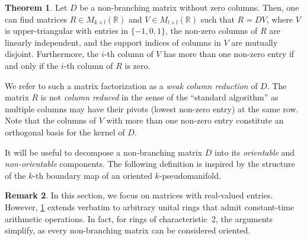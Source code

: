 \documentclass{article}
\theoremstyle{definition}
\newtheorem{theorem}{Theorem}[section]
\newtheorem{remark}[theorem]{Remark}
\begin{document}
\begin{theorem}
\label{thm:weakfactor}
    Let $D$ be a non-branching matrix without zero columns. 
    Then, one can find matrices $R\in M_{k\times l}(\mathbb{R})$ and $V\in M_{l\times l}(\mathbb{R})$
    such that $R=DV$, where $V$ is upper-triangular with entries in $\{-1,0,1\}$, the non-zero columns of $R$ are linearly independent, 
    and the support indices of columns in $V$ are mutually disjoint. Furthermore, the $i$-th column of $V$ has more than one non-zero entry if and only if the $i$-th column of $R$ is zero.
\end{theorem}
We refer to such a matrix factorization as a \emph{weak column reduction} of $D$. The matrix $R$ is not \emph{column reduced} in the sense of the ``standard algorithm'' \cite[Ch.~VII.1]{edelsbrunner2010computational} as multiple columns may have their pivots (lowest non-zero entry) at the same row. Note that the columns of $V$ with more than one non-zero entry constitute an orthogonal basis for the kernel of $D$.

It will be useful to decompose a non-branching matrix $D$ into its \emph{orientable} and \emph{non-orientable} components. The following definition is inspired by the structure of the $k$-th boundary map of an oriented $k$-pseudomanifold. 
\begin{remark}
In this section, we focus on matrices with real-valued entries. However, \cref{thm:weakfactor} extends verbatim to arbitrary unital rings that admit constant-time arithmetic operations. In fact, for rings of characteristic~2, the arguments simplify, as every non-branching matrix can be considered oriented.
\end{remark}
\end{document}
